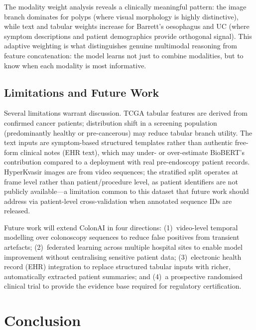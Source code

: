 \documentclass[conference]{IEEEtran}
\begin{document}
The modality weight analysis reveals a clinically meaningful pattern: the
image branch dominates for polyps (where visual morphology is highly
distinctive), while text and tabular weights increase for Barrett's
oesophagus and UC (where symptom descriptions and patient demographics
provide orthogonal signal). This adaptive weighting is what distinguishes
genuine multimodal reasoning from feature concatenation: the model learns
not just to combine modalities, but to know when each modality is most
informative.

\subsection{Limitations and Future Work}

Several limitations warrant discussion. TCGA tabular features are derived
from confirmed cancer patients; distribution shift in a screening population
(predominantly healthy or pre-cancerous) may reduce tabular branch utility.
The text inputs are symptom-based structured templates rather than
authentic free-form clinical notes (EHR text), which may under- or
over-estimate BioBERT's contribution compared to a deployment with real
pre-endoscopy patient records. HyperKvasir images are from video sequences;
the stratified split operates at frame level rather than patient/procedure
level, as patient identifiers are not publicly available---a limitation
common to this dataset that future work should address via patient-level
cross-validation when annotated sequence IDs are released.

Future work will extend ColonAI in four directions: (1)~video-level temporal
modelling over colonoscopy sequences to reduce false positives from transient
artefacts; (2)~federated learning across multiple hospital sites to enable
model improvement without centralising sensitive patient data;
(3)~electronic health record (EHR) integration to replace structured tabular
inputs with richer, automatically extracted patient summaries; and
(4)~a prospective randomised clinical trial to provide the evidence base
required for regulatory certification.

\section{Conclusion}
\end{document}

